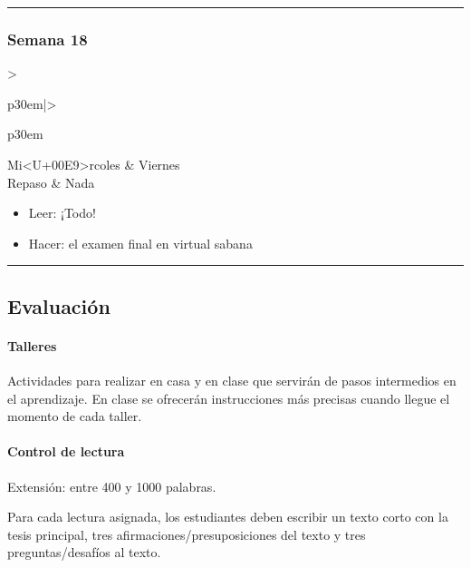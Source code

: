 \documentclass[spanish,]{article}
\let\oldparagraph\paragraph
\renewcommand{\paragraph}[1]{\oldparagraph{#1}\mbox{}}
\begin{document}
\begin{center}\rule{0.5\linewidth}{\linethickness}\end{center}

\subsubsection{Semana 18}\label{semana-18}

\begin{tabular}{>{\raggedright\arraybackslash}p{30em}|>{\raggedright\arraybackslash}p{30em}}
\hline
Mi<U+00E9>rcoles & Viernes\\
\hline
Repaso & Nada\\
\hline
\end{tabular}

\begin{itemize}
\item
  Leer: ¡Todo!
\item
  Hacer: el examen final en virtual sabana
\end{itemize}

\begin{center}\rule{0.5\linewidth}{\linethickness}\end{center}

\subsection{Evaluación}\label{evaluacion}

\paragraph{\texorpdfstring{\textbf{Talleres}}{Talleres}}\label{talleres}

Actividades para realizar en casa y en clase que servirán de pasos
intermedios en el aprendizaje. En clase se ofrecerán instrucciones más
precisas cuando llegue el momento de cada taller.

\paragraph{\texorpdfstring{\textbf{Control de
lectura}}{Control de lectura}}\label{control-de-lectura}

Extensión: entre 400 y 1000 palabras.

Para cada lectura asignada, los estudiantes deben escribir un texto
corto con la tesis principal, tres afirmaciones/presuposiciones del
texto y tres preguntas/desafíos al texto.
\end{document}
